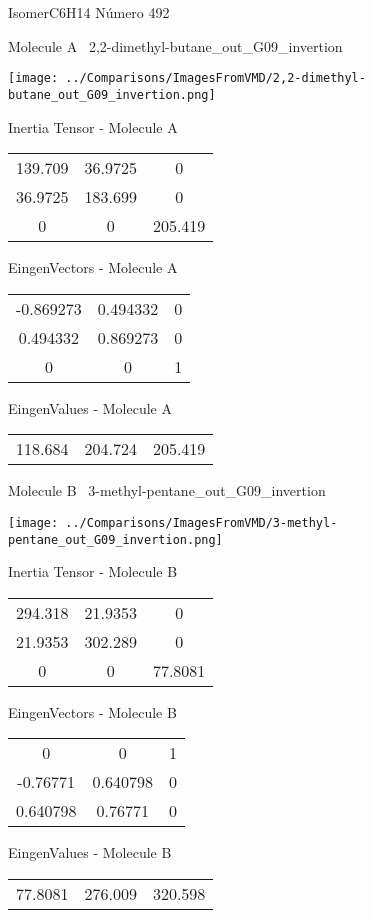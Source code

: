 \vtab[-3cm]
\begin{center}
{\large IsomerC6H14 \tab Número 492}
\end{center}
\begin{multicols}{2}
\begin{center}

Molecule A \
2,2-dimethyl-butane\_out\_G09\_invertion

\texttt{[image: ../Comparisons/ImagesFromVMD/2,2-dimethyl-butane\_out\_G09\_invertion.png]}

Inertia Tensor - Molecule A \\
\begin{tabular}{|c c c|}
139.709	 & 	36.9725	 & 	0	 \\
36.9725	 & 	183.699	 & 	0	 \\
0	 & 	0	 & 	205.419
\end{tabular}

\vtab
 EingenVectors - Molecule A     \\
\begin{tabular}{|c c c|}
-0.869273	 & 	0.494332	 & 	0	 \\
0.494332	 & 	0.869273	 & 	0	 \\
0	 & 	0	 & 	1
\end{tabular}

\vtab
 EingenValues - Molecule A     \\
\begin{tabular}{|c c c|}
118.684	 & 	204.724	 & 	205.419	 \\
\end{tabular}
\columnbreak

Molecule B \
3-methyl-pentane\_out\_G09\_invertion

\texttt{[image: ../Comparisons/ImagesFromVMD/3-methyl-pentane\_out\_G09\_invertion.png]}

Inertia Tensor - Molecule B \\
\begin{tabular}{|c c c|}
294.318	 & 	21.9353	 & 	0	 \\
21.9353	 & 	302.289	 & 	0	 \\
0	 & 	0	 & 	77.8081
\end{tabular}

\vtab
 EingenVectors - Molecule B     \\
\begin{tabular}{|c c c|}
0	 & 	0	 & 	1	 \\
-0.76771	 & 	0.640798	 & 	0	 \\
0.640798	 & 	0.76771	 & 	0
\end{tabular}

\vtab
 EingenValues - Molecule B     \\
\begin{tabular}{|c c c|}
77.8081	 & 	276.009	 & 	320.598	 \\
\end{tabular}

\end{center}
\end{multicols}

